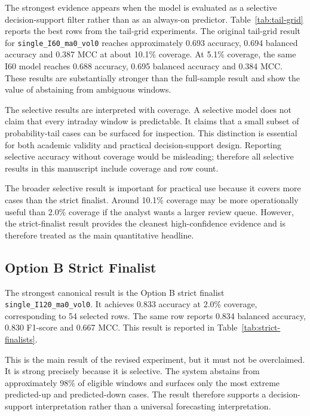 



The strongest evidence appears when the model is evaluated as a selective decision-support filter rather than as an always-on predictor. Table~\ref{tab:tail-grid} reports the best rows from the tail-grid experiments. The original tail-grid result for \texttt{single\_I60\_ma0\_vol0} reaches approximately 0.693 accuracy, 0.694 balanced accuracy and 0.387 MCC at about 10.1\% coverage. At 5.1\% coverage, the same I60 model reaches 0.688 accuracy, 0.695 balanced accuracy and 0.384 MCC. These results are substantially stronger than the full-sample result and show the value of abstaining from ambiguous windows.

The selective results are interpreted with coverage. A selective model does not claim that every intraday window is predictable. It claims that a small subset of probability-tail cases can be surfaced for inspection. This distinction is essential for both academic validity and practical decision-support design. Reporting selective accuracy without coverage would be misleading; therefore all selective results in this manuscript include coverage and row count.

The broader selective result is important for practical use because it covers more cases than the strict finalist. Around 10.1\% coverage may be more operationally useful than 2.0\% coverage if the analyst wants a larger review queue. However, the strict-finalist result provides the cleanest high-confidence evidence and is therefore treated as the main quantitative headline.

\subsection{Option B Strict Finalist}
\label{subsec:strict_finalist}




The strongest canonical result is the Option B strict finalist \texttt{single\_I120\_ma0\_vol0}. It achieves 0.833 accuracy at 2.0\% coverage, corresponding to 54 selected rows. The same row reports 0.834 balanced accuracy, 0.830 F1-score and 0.667 MCC. This result is reported in Table~\ref{tab:strict-finalists}.

This is the main result of the revised experiment, but it must not be overclaimed. It is strong precisely because it is selective. The system abstains from approximately 98\% of eligible windows and surfaces only the most extreme predicted-up and predicted-down cases. The result therefore supports a decision-support interpretation rather than a universal forecasting interpretation.

